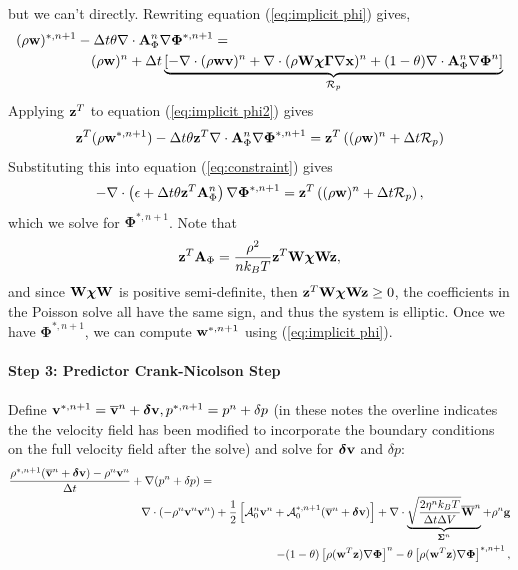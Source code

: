 \documentclass[final]{siamltex}
\def\Ab {{\bf A}}
\def\gb {{\bf g}}
\def\vb {{\bf v}}
\def\wb {{\bf w}}
\def\Wb {{\bf W}}
\def\xb {{\bf x}}
\def\zb {{\bf z}}
\def\chib   {\boldsymbol{\chi}}
\def\deltab {\boldsymbol{\delta}}
\def\Gammab {\boldsymbol{\Gamma}}
\def\Phib   {\boldsymbol{\Phi}}
\def\Sigmab {\boldsymbol{\Sigma}}
\def\half   {\frac{1}{2}}
\begin{document}
but we can't directly.  Rewriting equation (\ref{eq:implicit phi}) gives,
\begin{eqnarray}
(\rho\wb)^{*,n+1} - \Delta t\theta\nabla\cdot \Ab_\Phi^n\nabla\Phib^{*,n+1} &=& \nonumber\\
&&\hspace{-1.5in}(\rho\wb)^n + \Delta t\underbrace{\left[-\nabla\cdot(\rho\wb\vb)^n + \nabla\cdot(\rho\Wb\chib\Gammab\nabla\xb)^n + (1-\theta) \nabla\cdot \Ab_\Phi^n\nabla\Phib^n\right]}_{\mathcal{R}_p}\label{eq:implicit phi2}
\end{eqnarray}
Applying $\zb^T$ to equation (\ref{eq:implicit phi2}) gives
\begin{equation}
\zb^T(\rho\wb^{*,n+1}) - \Delta t\theta\zb^T\nabla\cdot \Ab_\Phi^n\nabla\Phib^{*,n+1} = \zb^T\left((\rho\wb)^n + \Delta t\mathcal{R}_p\right)
\end{equation}
Substituting this into equation (\ref{eq:constraint}) gives
\begin{equation}
-\nabla\cdot\left(\epsilon + \Delta t\theta\zb^T \Ab_\Phi^n\right)\nabla\Phib^{*,n+1} = \zb^T\left((\rho\wb)^n + \Delta t\mathcal{R}_p\right),
\end{equation}
which we solve for $\Phib^{*,n+1}$.  Note that
\begin{equation}
\zb^T \Ab_\Phi = \frac{\rho^2}{nk_BT}\zb^T\Wb\chib\Wb\zb,
\end{equation}
and since $\Wb\chib\Wb$ is positive semi-definite, then $\zb^T\Wb\chib\Wb\zb \ge 0$,
the coefficients in the Poisson solve all have the same sign, and thus the system
is elliptic.  Once we have $\Phib^{*,n+1}$, we can compute $\wb^{*,n+1}$ using
(\ref{eq:implicit phi}).\\ \\
{\bf Step 3: Predictor Crank-Nicolson Step}\\ \\
Define $\vb^{*,n+1} = \overline\vb^n + \deltab\vb, p^{*,n+1} = p^n + \delta p$ (in these notes the overline
indicates the the velocity field has been modified to incorporate the boundary conditions on the
full velocity field after the solve) and solve
for $\deltab\vb$ and $\delta p$:
\begin{eqnarray}
\frac{\rho^{*,n+1}(\overline\vb^n + \deltab\vb) - \rho^n\vb^n}{\Delta t} + \nabla(p^n+\delta p) &=&\nonumber\\
&&\hspace{-1in}\nabla\cdot(-\rho^n\vb^n\vb^n) + \half\left[\mathcal{A}_0^n\vb^n + \mathcal{A}_0^{*,n+1}(\overline\vb^n + \deltab\vb)\right] + \nabla\cdot\underbrace{\sqrt{\frac{2\eta^n k_B T}{\Delta t\Delta V}}\overline\Wb^n}_{\Sigmab^n} + \rho^n\gb\nonumber\\
&&\hspace{-1in}- (1-\theta)\left[\rho(\wb^T\zb)\nabla\Phib\right]^n - \theta\left[\rho(\wb^T\zb)\nabla\Phib\right]^{*,n+1},
\end{eqnarray}
\end{document}
